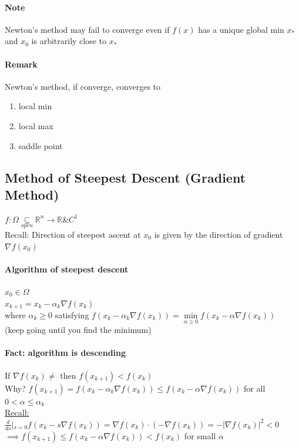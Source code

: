 \documentclass[11pt]{article}
\newcommand{\real}[0]{\mathbb{R}}
\newcommand{\under}[1]{\underline{#1}}
\begin{document}
\paragraph{Note}
Newton's method may fail to converge even if $f(x)$ has a unique global min $x_*$ and $x_0$ is arbitrarily close to $x_*$
\paragraph{Remark}
Newton's method, if converge, converges to
\begin{enumerate}
	\item local min
	\item local max
	\item saddle point
\end{enumerate}

\subsection{Method of Steepest Descent (Gradient Method)}
$f: \Omega \underset{open}{\subseteq} \real^n \rightarrow \real \& C^1$ \\
Recall: Direction of steepest ascent at $x_0$ is given by the direction of gradient $\nabla f(x_0)$
\paragraph{Algorithm of steepest descent}
$x_0 \in \Omega$ \\
$x_{k+1} = x_k - \alpha_k \nabla f(x_k)$\\
where $\alpha_k \geq 0$ satisfying $f(x_k - \alpha_k \nabla f(x_k)) = \underset{\alpha \geq 0}{\min} f(x_k - \alpha \nabla f(x_k))$ \\

(keep going until you find the minimum) \\
\paragraph{Fact: algorithm is descending}
If $\nabla f(x_k) \neq$ then $f(x_{k+1}) < f(x_k)$\\
Why? $f(x_{k+1}) = f(x_k - \alpha_k \nabla f(x_k)) \leq f(x_k - \alpha \nabla f(x_k))$ for all 
$ 0 < \alpha \leq \alpha_k$ \\
\under{Recall:} $\frac{d}{ds}|_{s=0} f(x_k - s\nabla f(x_k)) = \nabla f(x_k) \cdot (-\nabla f(x_k)) = - |\nabla f(x_k)|^2 < 0$ \\
$\implies f(x_{k+1}) \leq f(x_k - \alpha \nabla f(x_k)) < f(x_k)$ for small $\alpha$
\end{document}
